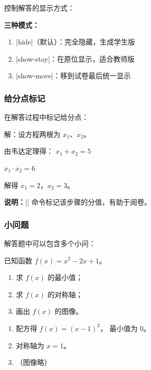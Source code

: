 控制解答的显示方式：

\begin{latexcode}
\end{latexcode}

\textbf{三种模式：}
\begin{enumerate}
  \item |hide|（默认）：完全隐藏，生成学生版
  \item |show-stay|：在原位显示，适合教师版
  \item |show-move|：移到试卷最后统一显示
\end{enumerate}

\subsubsection{给分点标记}

在解答过程中标记给分点：

\begin{latexcode}
  \begin{solution}
    解：设方程两根为 $x_1$、$x_2$。

    由韦达定理得：
    $x_1 + x_2 = 5$ 

    $x_1 \cdot x_2 = 6$ 

    解得 $x_1 = 2$，$x_2 = 3$。
  \end{solution}
\end{latexcode}

\textbf{说明：}|| 命令标记该步骤的分值，有助于阅卷。

\subsubsection{小问题}

解答题中可以包含多个小问：

\begin{latexcode}
  \begin{problem}[points = 12]
    已知函数 $f(x) = x^2 - 2x + 1$。
    \begin{enumerate}
      \item 求 $f(x)$ 的最小值；
      \item 求 $f(x)$ 的对称轴；
      \item 画出 $f(x)$ 的图像。
    \end{enumerate}

    \begin{solution}
      \begin{enumerate}
        \item 配方得 $f(x) = (x-1)^2$，
              最小值为 $0$。
        \item 对称轴为 $x = 1$。
        \item （图像略）
      \end{enumerate}
    \end{solution}
  \end{problem}
\end{latexcode}


